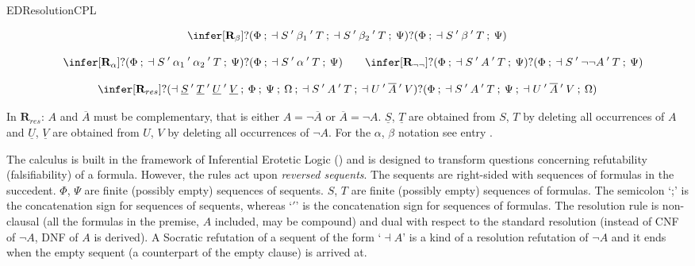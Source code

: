 \begin{entry}{EDResolutionCPL}  




\begin{calculus}


$$\infer[\textbf{R}_{\beta}]
{?(\Phi\:;\:\dashv S\:'\:\beta_{1}\:'\:T\:;\:\dashv S\:'\:\beta_{2}\:'\:T\:;\:\Psi)}
{?(\Phi\:;\:\dashv S\:'\:\beta\:'\:T\:;\:\Psi)} $$

\vspace{-0.3cm}

$$
\quad
\infer[\textbf{R}_{\alpha}]
{?(\Phi\:;\:\dashv S\:'\:\alpha_{1}\:'\:\alpha_{2}\:'\:T\:;\:\Psi)}
{?(\Phi\:;\:\dashv   S\:'\:\alpha\:'\:T\:;\:\Psi)}
\qquad
\infer[\textbf{R}_{\neg\neg}]
{?(\Phi\:;\:\dashv S\:'\:A\:'\:T\:;\:\Psi)}
{?(\Phi\:;\:\dashv S\:'\:\neg\neg A\:'\:T\:;\:\Psi)}$$

\vspace{-0.3cm}

$$\infer[\textbf{R}_{res}]
{?(\dashv \underline{S}\:'\:\underline{T}\:'\:\underline{U}\:'\:\underline{V}\:;\:\Phi\:;\:\Psi\:;\:\Omega\:;\:\dashv S\:'\: A\:'\:T\:;\:\dashv U\:'\:\overline{A}\:'\:V)}
{?(\Phi\:;\:\dashv S\:'\: A\:'\:T\:;\:\Psi\:;\:\dashv U\:'\:\overline{A}\:'\:V\:;\:\Omega )}$$

In $\mathbf{R}_{res}$: $A$ and $\overline{A}$ must be complementary, that is either $A = \lnot \overline{A}$ or $\overline{A} = \lnot A$. $\underline{S}$, $\underline{T}$ are obtained from $S$, $T$ by deleting all occurrences of $A$ and $\underline{U}$, $\underline{V}$ are obtained from $U$, $V$ by deleting all occurrences of $\lnot A$. For the $\alpha$, $\beta$ notation see entry .
\end{calculus}



\begin{clarifications}
The calculus is built in the framework of Inferential Erotetic Logic (\cite{AW:2013}) and is designed to transform questions concerning refutability (falsifiability) of a formula. However, the rules act upon \textit{reversed sequents}. The sequents are right-sided with sequences of formulas in the succedent. $\Phi$, $\Psi$ are finite (possibly empty) sequences of sequents. $S$, $T$ are finite (possibly empty) sequences of formulas. The semicolon `;' is the concatenation sign for sequences of sequents, whereas `$'$' is the concatenation sign for sequences of formulas. The resolution rule is non-clausal (all the formulas in the premise, $A$ included, may be compound) and dual with respect to the standard resolution (instead of CNF of $\lnot A$, DNF of $A$ is derived). A Socratic refutation of a sequent of the form `$\dashv A$' is a kind of a resolution refutation of $\lnot A$ and it ends when the empty sequent (a counterpart of the empty clause) is arrived at.
\end{clarifications}


\end{entry}
